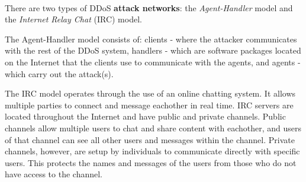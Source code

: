 \raggedright

There are two types of DDoS \textbf{attack networks}\textsuperscript{\cite{specht2003taxonomies}}: the \textit{Agent-Handler} model and the \textit{Internet Relay Chat} (IRC) model.

\vspace{0.5cm}

The Agent-Handler model consists of: clients - where the attacker communicates with the rest of the DDoS system, handlers - which are software packages located on the Internet that the clients use to communicate with the agents, and agents - which carry out the attack(s).

The IRC model operates through the use of an online chatting system. It allows multiple parties to connect and message eachother in real time. IRC servers are located throughout the Internet and have public and private channels. Public channels allow multiple users to chat and share content with eachother, and users of that channel can see all other users and messages within the channel. Private channels, however, are setup by individuals to communicate directly with specific users. This protects the names and messages of the users from those who do not have access to the channel.

\vspace{0.5cm}

